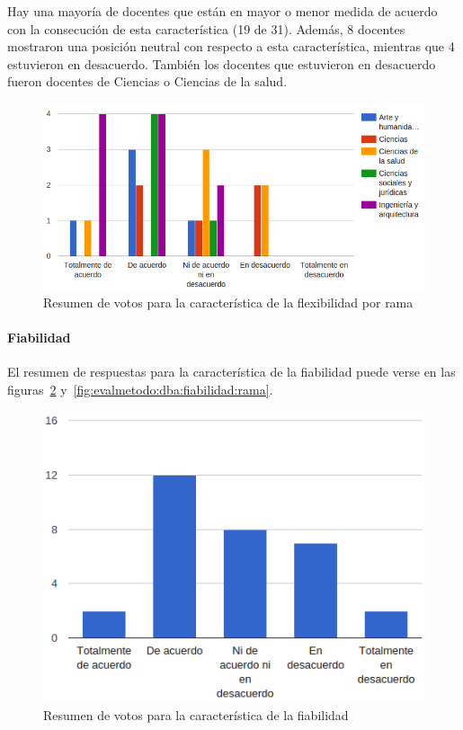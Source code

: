 Hay una mayoría de docentes que están en mayor o menor medida de acuerdo con la consecución de esta característica (19 de 31). Además, 8 docentes mostraron una posición neutral con respecto a esta característica, mientras que 4 estuvieron en desacuerdo. También los docentes que estuvieron en desacuerdo fueron docentes de Ciencias o Ciencias de la salud.

\begin{figure}[h]
  \begin{center}
    \includegraphics[scale=0.5]{C_DBA_flexibilidad_rama.png}
  \end{center}
  \caption{Resumen de votos para la característica de la flexibilidad por rama}
  \label{fig:evalmetodo:dba:flexibilidad:rama}
\end{figure}


\newpage
\paragraph*{Fiabilidad}

El resumen de respuestas para la característica de la fiabilidad puede verse en las figuras~\ref{fig:evalmetodo:dba:fiabilidad} y~\ref{fig:evalmetodo:dba:fiabilidad:rama}.

\begin{figure}[h]
  \begin{center}
    \includegraphics[scale=0.5]{C_DBA_fiabilidad.png}
  \end{center}
  \caption{Resumen de votos para la característica de la fiabilidad}
  \label{fig:evalmetodo:dba:fiabilidad}
\end{figure}

